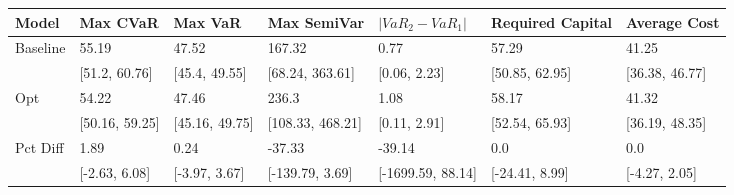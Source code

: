\begin{tabular}{lllllll}
\toprule
   Model &       Max CVaR &        Max VaR &      Max SemiVar & $|VaR_2 - VaR_1|$ & Required Capital &   Average Cost \\
\midrule
Baseline &          55.19 &          47.52 &           167.32 &              0.77 &            57.29 &          41.25 \\
         &  [51.2, 60.76] &  [45.4, 49.55] &  [68.24, 363.61] &      [0.06, 2.23] &   [50.85, 62.95] & [36.38, 46.77] \\
     Opt &          54.22 &          47.46 &            236.3 &              1.08 &            58.17 &          41.32 \\
         & [50.16, 59.25] & [45.16, 49.75] & [108.33, 468.21] &      [0.11, 2.91] &   [52.54, 65.93] & [36.19, 48.35] \\
Pct Diff &           1.89 &           0.24 &           -37.33 &            -39.14 &              0.0 &            0.0 \\
         &  [-2.63, 6.08] &  [-3.97, 3.67] &  [-139.79, 3.69] & [-1699.59, 88.14] &   [-24.41, 8.99] &  [-4.27, 2.05] \\
\bottomrule
\end{tabular}
